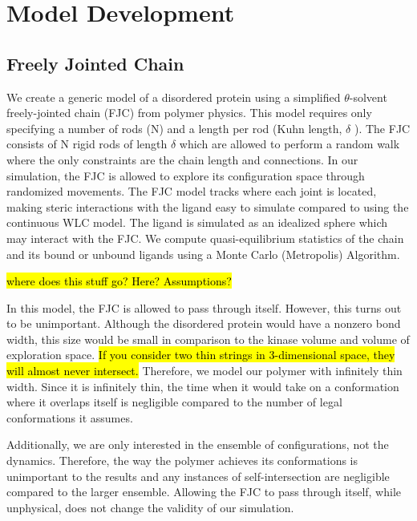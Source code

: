 \documentclass[../AdvancementSummary.tex]{subfiles}
\begin{document}
\section{Model Development}


\subsection{Freely Jointed Chain}

We create a generic model of a disordered protein using a simplified $\theta$-solvent freely-jointed chain (FJC) from polymer physics. This model requires only specifying a number of rods (N) and a length per rod (Kuhn length, $\delta$ ).  The FJC consists of N rigid rods of length $\delta$ which are allowed to perform a random walk where the only constraints are the chain length and connections. In our simulation, the FJC is allowed to explore its configuration space through randomized movements.  The FJC model tracks where each joint is located, making steric interactions with the ligand easy to simulate compared to using the continuous WLC model.  The ligand is simulated as an idealized sphere which may interact with the FJC. We compute quasi-equilibrium statistics of the chain and its bound or unbound ligands using a Monte Carlo (Metropolis) Algorithm. 


\hl{where does this stuff go?  Here?  Assumptions?}

In this model, the FJC is allowed to pass through itself. However, this turns out to be unimportant. Although the disordered protein would have a nonzero bond width, this size would be small in comparison to the kinase volume and volume of exploration space.  \hl{If you consider two thin strings in 3-dimensional space, they will almost never intersect.}  Therefore, we model our polymer with infinitely thin width.  Since it is infinitely thin, the time when it would take on a conformation where it overlaps itself is negligible compared to the number of legal conformations it assumes.

Additionally, we are only interested in the ensemble of configurations, not the dynamics. Therefore, the way the polymer achieves its conformations is unimportant to the results and any instances of self-intersection are negligible compared to the larger ensemble. Allowing the FJC to pass through itself, while unphysical, does not change the validity of our simulation.
\end{document}
